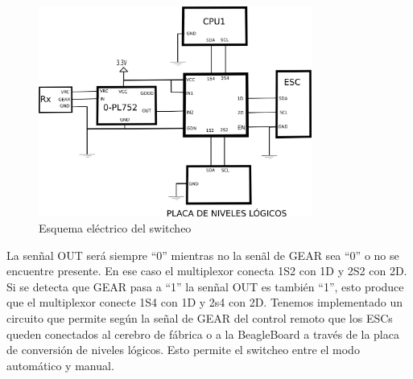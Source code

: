 \documentclass[main]{subfiles}
\begin{document}
\begin{figure}
\begin{center}
\includegraphics[width=0.8\textwidth]{./pics_switcheo/path3552-7.png}
\caption{Esquema el\'ectrico del switcheo}
\label{fig:switcheo}
\end{center}
\end{figure}

La sen\~nal OUT ser\'a siempre ``0'' mientras no la sen\~al de GEAR sea ``0'' o no se encuentre presente. En ese caso el multiplexor conecta 1S2 con 1D y 2S2 con 2D. Si se detecta que GEAR pasa a ``1'' la sen\~nal OUT es tambi\'en ``1'', esto produce que el multiplexor conecte 1S4 con 1D y 2s4 con 2D. Tenemos implementado un circuito que permite seg\'un la se\~nal de GEAR del control remoto que los ESCs queden conectados al cerebro de f\'abrica o a la BeagleBoard a trav\'es de la placa de conversi\'on de niveles l\'ogicos. Esto permite el switcheo entre el modo autom\'atico y manual.
\end{document}
